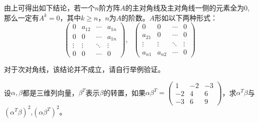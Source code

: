 \documentclass[a4paper]{report}
\begin{document}
\begin{tips}
由上可得出如下结论，若一个$n$阶方阵$A$的\textcolor[rgb]{1.00,0.00,0.00}{主对角线}及\textcolor[rgb]{1.00,0.00,0.00}{主对角线一侧}的元素\textcolor[rgb]{1.00,0.00,0.00}{全为0},那么一定有$A^{k}=0$，其中$k\geq n$，$n$为$A$的阶数。$A$形如以下两种形式：
\begin{equation*}
\begin{pmatrix}
0&a_{12}&\cdots&a_{1n}\\
0&0&\cdots&a_{1n}\\
\vdots&\vdots&\ddots&\vdots\\
0&0&\cdots&0
\end{pmatrix},~~~
\begin{pmatrix}
0&0&\cdots&0\\
a_{21}&0&\cdots&0\\
\vdots&\vdots&\ddots&\vdots\\
a_{n1}&a_{n2}&\cdots&0
\end{pmatrix}
\end{equation*}

对于次对角线，该结论并不成立，请自行举例验证。
\end{tips}

\EX 设$\alpha,\beta$都是三维列向量，$\beta^T$表示$\beta$的转置，如果$\alpha\beta^T=
\begin{pmatrix}
1&-2&-3\\
-2&4&6\\
-3&6&9
\end{pmatrix}
$，求$\alpha^T\beta$与$(\alpha^T\beta)^2$,$(\alpha\beta^T)^2$。
\end{document}

